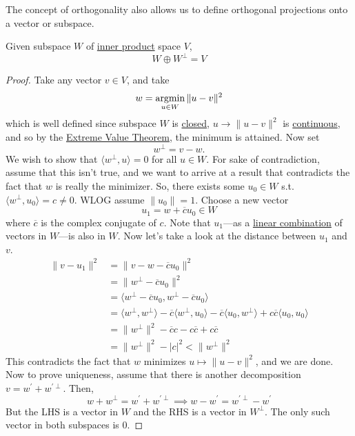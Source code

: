   The concept of orthogonality also allows us to define orthogonal projections onto a vector or subspace. 

	\begin{lemma}
	  \label{thm:orthogonal-decomposition-theorem}
		Given subspace $W$ of \hyperref[def:inner-product]{inner product} space $V$, 
	  \begin{equation}
			 W \oplus W^\perp = V  
	  \end{equation}
	\end{lemma}
	\begin{proof}
		Take any vector $v \in V$, and take
		\begin{equation}
			w = \operatorname*{argmin}_{u \in W} \|u - v\|^2
		\end{equation}
		which is well defined since subspace $W$ is \hyperref[pst-def:closed]{closed}, $u \to \|u - v\|^2$ is \hyperref[pst-def:continuous_func]{continuous}, and so by the \hyperref[pst-thm:evt]{Extreme Value Theorem}, the minimum is attained. Now set 
		\begin{equation}
			w^\perp = v - w. 
		\end{equation}
		We wish to show that $\langle w^\perp, u \rangle = 0$ for all $u \in W$. For sake of contradiction, assume that this isn't true, and we want to arrive at a result that contradicts the fact that $w$ is really the minimizer. So, there exists some $u_0 \in W$ s.t. $\langle w^\perp, u_0 \rangle = c \neq 0$. WLOG assume $\|u_0\| = 1$. Choose a new vector 
		\begin{equation}
			u_1 = w + \overline{c} u_0 \in W
		\end{equation}
		where $\overline{c}$ is the complex conjugate of $c$. Note that $u_1$---as a \hyperref[def:linear-combination]{linear combination} of vectors in $W$---is also in $W$. Now let's take a look at the distance between $u_1$ and $v$. 
		\begin{align}
			\|v - u_1\|^2 & = \|v - w - \overline{c} u_0\|^2 \\ 
										& = \|w^\perp - \overline{c} u_0\|^2 \\ 
										& = \langle w^\perp - \overline{c} u_0, w^\perp - \overline{c} u_0 \rangle \\ 
										& = \langle w^\perp, w^\perp \rangle - \overline{c} \langle w^\perp, u_0 \rangle - \overline{c} \langle u_0, w^\perp \rangle + c \overline{c} \langle u_0, u_0 \rangle \\ 
										& = \|w^\perp\|^2 - \overline{c} c - c \overline{c} + c \overline{c} \\ 
										& = \|w^\perp\|^2 - |c|^2 < \|w^\perp\|^2
		\end{align}
		This contradicts the fact that $w$ minimizes $u \mapsto \|u - v\|^2$, and we are done. Now to prove uniqueness, assume that there is another decomposition $v = w^\prime + w^{\prime\perp}$. Then, 
		\begin{equation}
			w + w^\perp = w^\prime + w^{\prime \perp} \implies w - w^\prime = w^{\prime\perp} - w^\prime 
		\end{equation}
		But the LHS is a vector in $W$ and the RHS is a vector in $W^\perp$. The only such vector in both subspaces is $0$. 
	\end{proof}

